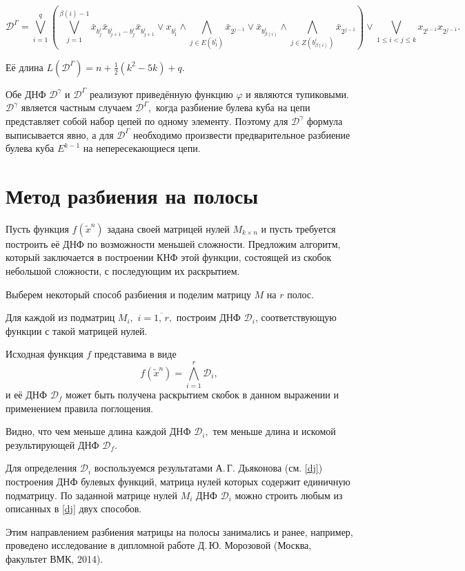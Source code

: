\documentclass[12pt,a4paper,oneside,fleqn,leqno]{article}
\theoremstyle{definition}
\begin{document}
			$$
				\mathcal{D}^{\Gamma} = \bigvee_{i = 1}^q \left(\bigvee_{j = 1}^{\beta(i) - 1} \bar{x}_{b_j^i} \bar{x}_{b_{j + 1}^i - b_j^i} \bar{x}_{b_{j + 1}^i} \vee x_{b_1^i} \wedge \bigwedge_{j \in E(b_1^i)}\bar{x}_{2^{j - 1}} \vee \bar{x}_{b^i_{\beta(i)}} \wedge \bigwedge_{j \in Z(b^i_{\beta(i)})}\bar{x}_{2^{j - 1}} \right)
				 \vee \bigvee_{1 \leqslant i < j \leqslant k} x_{2^{i - 1}} x_{2^{j - 1}}.
			$$\par
			Её длина $L(\mathcal{D}^{\Gamma}) = n + \frac{1}{2}(k^2 - 5k) + q.$\par
			Обе ДНФ $\mathcal{D}^{\gamma}$ и $\mathcal{D}^{\Gamma}$ реализуют приведённую функцию $\varphi$ и являются тупиковыми. $\mathcal{D}^{\gamma}$ является частным случаем $\mathcal{D}^{\Gamma},$ когда разбиение булева куба на цепи представляет собой набор цепей по одному элементу. Поэтому для $\mathcal{D}^{\gamma}$ формула выписывается явно, а для $\mathcal{D}^{\Gamma}$ необходимо произвести предварительное разбиение булева куба $E^{k - 1}$ на непересекающиеся цепи.\par
	\newpage
	\section{Метод разбиения на полосы}
		Пусть функция $f(\tilde x^n)$ задана своей матрицей нулей $M_{k \times n}$ и пусть требуется построить её ДНФ по возможности меньшей сложности. Предложим алгоритм, который заключается в построении КНФ этой функции, состоящей из скобок небольшой сложности, с последующим их раскрытием.\par
		Выберем некоторый способ разбиения и поделим матрицу $M$ на $r$ полос.\par
		Для каждой из подматриц $M_i,\,\,i = \overline{1,\,r},$ построим ДНФ $\mathcal{D}_i$, соответствующую функции с такой матрицей нулей.\par
		Исходная функция $f$ представима в виде
		$$
			f(\tilde x^n) = \bigwedge_{i = 1}^r \mathcal{D}_i,
		$$
		и её ДНФ $\mathcal{D}_f$ может быть получена раскрытием скобок в данном выражении и применением правила поглощения.\par
		Видно, что чем меньше длина каждой ДНФ $\mathcal{D}_i,$ тем меньше длина и искомой результирующей ДНФ $\mathcal{D}_f.$\par
		Для определения $\mathcal{D}_i$ воспользуемся результатами А.\,Г. Дьяконова (см. \ref{dj}) построения ДНФ булевых функций, матрица нулей которых содержит единичную подматрицу. По заданной матрице нулей $M_i$ ДНФ $\mathcal{D}_i$ можно строить любым из описанных в \ref{dj} двух способов.\par
		Этим направлением разбиения матрицы на полосы занимались и ранее, например, проведено исследование в дипломной работе Д.\,Ю. Морозовой (Москва, факультет ВМК, 2014).\par
\end{document}
